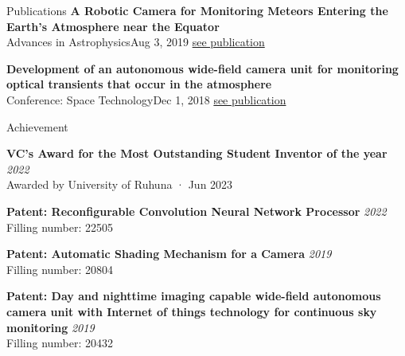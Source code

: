 \documentclass[
	11pt, %
]{./assets/resume} %
\begin{document}
\begin{rSection}{Publications}
	\textbf{A Robotic Camera for Monitoring Meteors Entering the Earth’s Atmosphere near the Equator} \\
	{Advances in Astrophysics}{Aug 3, 2019}
	\href{http://www.isaacpub.org/images/PaperPDF/AdAp_100132_2019082716321960559.pdf}{see publication}

	\textbf{Development of an autonomous wide-field camera unit for monitoring optical transients that occur in the atmosphere} \\
	{Conference: Space Technology}{Dec 1, 2018}
	\href{https://www.researchgate.net/publication/332246125_Development_of_an_autonomous_wide-field_camera_unit_for_monitoring_optical_transients_that_occur_in_the_atmosphere}{see publication}

\end{rSection}

\pagebreak







\begin{rSection}{Achievement}

	\textbf{VC's Award for the Most Outstanding Student Inventor of the year} \hfill \textit{2022} \\
	Awarded by University of Ruhuna · Jun 2023

	\textbf{Patent: Reconfigurable Convolution Neural Network Processor} \hfill \textit{2022} \\ 
	Filling number: 22505

	\textbf{Patent: Automatic Shading Mechanism for a Camera} \hfill \textit{2019} \\ 
	Filling number: 20804

	\textbf{Patent: Day and nighttime imaging capable wide-field autonomous camera unit with Internet of things technology for continuous sky monitoring} \hfill \textit{2019} \\ 
	Filling number: 20432



\end{rSection}
\end{document}
